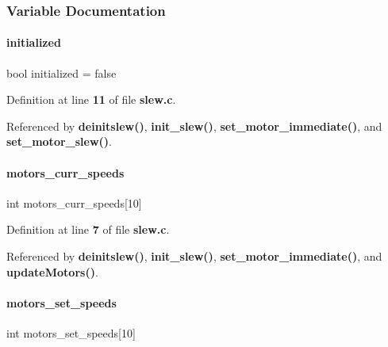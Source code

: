 \subsubsection{Variable Documentation}
\mbox{\label{slew_8c_aedeffc7d23da25d52b9a50045189fe2b}} 
\paragraph{initialized}
{\footnotesize\ttfamily bool initialized = false\hspace{0.3cm}{\ttfamily [static]}}



Definition at line \textbf{ 11} of file \textbf{ slew.\+c}.



Referenced by \textbf{ deinitslew()}, \textbf{ init\+\_\+slew()}, \textbf{ set\+\_\+motor\+\_\+immediate()}, and \textbf{ set\+\_\+motor\+\_\+slew()}.

\mbox{\label{slew_8c_a69e0d1204ea4d87b7366c9cd79527984}} 
\paragraph{motors\+\_\+curr\+\_\+speeds}
{\footnotesize\ttfamily int motors\+\_\+curr\+\_\+speeds[10]\hspace{0.3cm}{\ttfamily [static]}}



Definition at line \textbf{ 7} of file \textbf{ slew.\+c}.



Referenced by \textbf{ deinitslew()}, \textbf{ init\+\_\+slew()}, \textbf{ set\+\_\+motor\+\_\+immediate()}, and \textbf{ update\+Motors()}.

\mbox{\label{slew_8c_acf7558ed17fdecd298ea7eb82291c7d0}} 
\paragraph{motors\+\_\+set\+\_\+speeds}
{\footnotesize\ttfamily int motors\+\_\+set\+\_\+speeds[10]\hspace{0.3cm}{\ttfamily [static]}}



